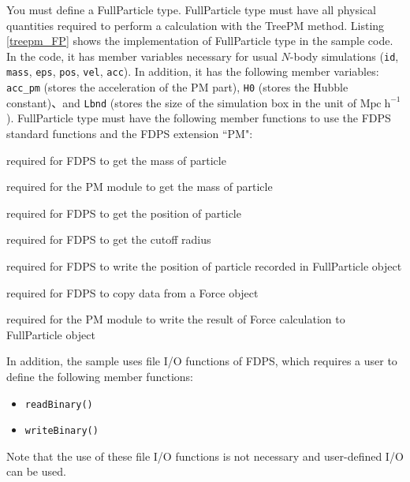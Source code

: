 You must define a \textsf{FullParticle} type. \textsf{FullParticle} type must have all physical quantities required to perform a calculation with the TreePM method. Listing \ref{treepm_FP} shows the implementation of \textsf{FullParticle} type in the sample code. In the code, it has member variables necessary for usual $N$-body simulations (\texttt{id}, \texttt{mass}, \texttt{eps}, \texttt{pos}, \texttt{vel}, \texttt{acc}). In addition, it has the following member variables: \texttt{acc\_pm} (stores the acceleration of the PM part), \texttt{H0} (stores the Hubble constant)、and \texttt{Lbnd} (stores the size of the simulation box in the unit of $\mathrm{Mpc\;h^{-1}}$). \textsf{FullParticle} type must have the following member functions to use the FDPS standard functions and the FDPS extension ``\textsf{PM}":
\begin{description}[leftmargin=*,itemsep=-1ex,style=nextline]
\item[\texttt{getCharge()}] required for FDPS to get the mass of particle
\item[\texttt{getChargeParticleMesh()}] required for the \textsf{PM} module to get the mass of particle
\item[\texttt{getPos()}] required for FDPS to get the position of particle
\item[\texttt{getRSearch()}] required for FDPS to get the cutoff radius
\item[\texttt{setPos()}] required for FDPS to write the position of particle recorded in \textsf{FullParticle} object
\item[\texttt{copyFromForce()}] required for FDPS to copy data from a \textsf{Force} object
\item[\texttt{copyFromForceParticleMesh()}] required for the \textsf{PM} module to write the result of Force calculation to \textsf{FullParticle} object
\end{description}
In addition, the sample uses file I/O functions of FDPS, which requires a user to define the following member functions:
\begin{itemize}[leftmargin=*,itemsep=-1ex]
\item \texttt{readBinary()}
\item \texttt{writeBinary()}
\end{itemize}
Note that the use of these file I/O functions is not necessary and user-defined I/O can be used.



